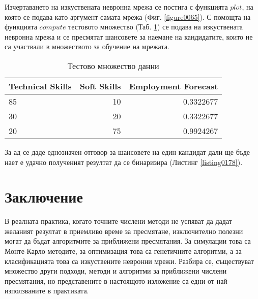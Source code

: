 Изчертаването на изкуствената невронна мрежа се постига с функцията $plot$, на която се подава като аргумент самата мрежа (Фиг. \ref{figure0065}). С помощта на функцията $compute$ тестовото множество (Таб. \ref{table0008}) се подава на изкуствената невронна мрежа и се пресмятат шансовете за наемане на кандидатите, които не са участвали в множеството за обучение на мрежата.

\begin{table}[h!]
\centering
\begin{tabular}{|l|r|r|} 
	\rowcolor{lightgray}
	\hline
	Technical Skills & Soft Skills & Employment Forecast \\
	\hline\hline
	85 & 10 & 0.3322677 \\
	\hline
	30 & 20 & 0.3322677 \\
	\hline
	20 & 75 & 0.9924267 \\
	\hline
\end{tabular}
\caption{Тестово множество данни}
\label{table0008}
\end{table}

За ад се даде еднозначен отговор за шансовете на един кандидат дали ще бъде нает е удачно полученият резултат да се бинаризира (Листинг \ref{listing0178}).

\section*{Заключение}

В реалната практика, когато точните числени методи не успяват да дадат желаният резултат в приемливо време за пресмятане, изключително полезни могат да бъдат алгоритмите за приближени пресмятания. За симулации това са Монте-Карло методите, за оптимизация това са генетичните алгоритми, а за класификацията това са изкуствените невронни мрежи. Разбира се, съществуват множество други подходи, методи и алгоритми за приближени числени пресмятания, но представените в настоящото изложение са едни от най-използваните в практиката.

